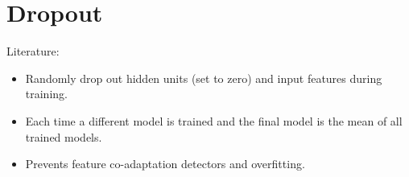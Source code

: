 \section{Dropout}\label{sec:dropout}
Literature: \cite{Hinton2012,Hinton2014,Wang2013}

\begin{itemize}
    \item Randomly drop out hidden units (set to zero) and input features
          during training.
    \item Each time a different model is trained and the final model is the
          mean of all trained models.
    \item Prevents feature co-adaptation detectors and overfitting.
\end{itemize}
